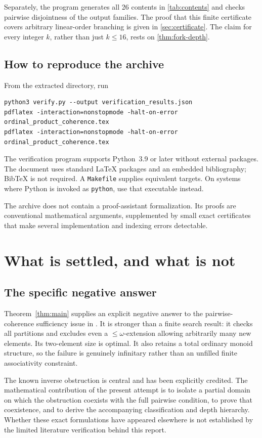 \documentclass[11pt,letterpaper]{article}
\numberwithin{equation}{section}
\theoremstyle{definition}
\theoremstyle{remark}
\begin{document}
Separately, the program generates all 26 contents in \cref{tab:contents} and checks pairwise disjointness of the output families. The proof that this finite certificate covers arbitrary linear-order branching is given in \cref{sec:certificate}. The claim for every integer $k$, rather than just $k\leq16$, rests on \cref{thm:fork-depth}.

\subsection{How to reproduce the archive}
From the extracted directory, run
\begin{lstlisting}
python3 verify.py --output verification_results.json
pdflatex -interaction=nonstopmode -halt-on-error ordinal_product_coherence.tex
pdflatex -interaction=nonstopmode -halt-on-error ordinal_product_coherence.tex
\end{lstlisting}
The verification program supports Python~3.9 or later without external packages. The document uses standard LaTeX packages and an embedded bibliography; BibTeX is not required. A \texttt{Makefile} supplies equivalent targets. On systems where Python is invoked as \texttt{python}, use that executable instead.

The archive does not contain a proof-assistant formalization. Its proofs are conventional mathematical arguments, supplemented by small exact certificates that make several implementation and indexing errors detectable.

\section{What is settled, and what is not}
\label{sec:scope}
\subsection{The specific negative answer}
Theorem~\ref{thm:main} supplies an explicit negative answer to the pairwise-coherence sufficiency issue in \cite[Remark~7.1(b)]{LippariniNIS}. It is stronger than a finite search result: it checks all partitions and excludes even a $\leq\omega$-extension allowing arbitrarily many new elements. Its two-element size is optimal. It also retains a total ordinary monoid structure, so the failure is genuinely infinitary rather than an unfilled finite associativity constraint.

The known inverse obstruction is central and has been explicitly credited. The mathematical contribution of the present attempt is to isolate a partial domain on which the obstruction coexists with the full pairwise condition, to prove that coexistence, and to derive the accompanying classification and depth hierarchy. Whether these exact formulations have appeared elsewhere is not established by the limited literature verification behind this report.
\end{document}
